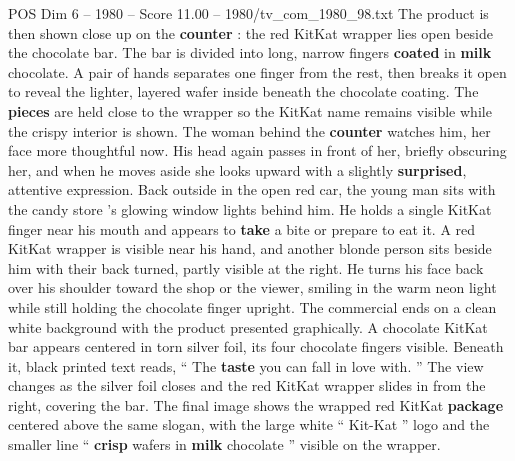 \begin{textsample}{POS Dim 6 – 1980 – Score 11.00 – 1980/tv\_com\_1980\_98.txt}
The product is then shown close up on the \textbf{counter} : the red KitKat wrapper lies open beside the chocolate bar.
The bar is divided into long, narrow fingers \textbf{coated} in \textbf{milk} chocolate.
A pair of hands separates one finger from the rest, then breaks it open to reveal the lighter, layered wafer inside beneath the chocolate coating.
The \textbf{pieces} are held close to the wrapper so the KitKat name remains visible while the crispy interior is shown.
The woman behind the \textbf{counter} watches him, her face more thoughtful now.
His head again passes in front of her, briefly obscuring her, and when he moves aside she looks upward with a slightly \textbf{surprised}, attentive expression.
Back outside in the open red car, the young man sits with the candy store ’s glowing window lights behind him.
He holds a single KitKat finger near his mouth and appears to \textbf{take} a bite or prepare to eat it.
A red KitKat wrapper is visible near his hand, and another blonde person sits beside him with their back turned, partly visible at the right.
He turns his face back over his shoulder toward the shop or the viewer, smiling in the warm neon light while still holding the chocolate finger upright.
The commercial ends on a clean white background with the product presented graphically.
A chocolate KitKat bar appears centered in torn silver foil, its four chocolate fingers visible.
Beneath it, black printed text reads, “ The \textbf{taste} you can fall in love with. ” The view changes as the silver foil closes and the red KitKat wrapper slides in from the right, covering the bar.
The final image shows the wrapped red KitKat \textbf{package} centered above the same slogan, with the large white “ Kit-Kat ” logo and the smaller line “ \textbf{crisp} wafers in \textbf{milk} chocolate ” visible on the wrapper.

\end{textsample}
